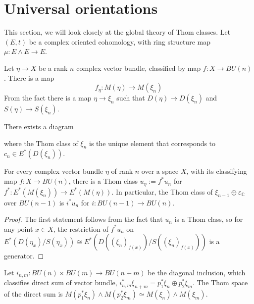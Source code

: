 \section{Universal orientations}\label{sec:chromatichomotopy-universalorientation}


This section, we will look closely at the global theory of Thom classes. Let $(E,t)$ be a complex oriented cohomology, with ring structure map $\mu:E\wedge E\to E$.

Let $\eta\to X$ be a rank $n$ complex vector bundle, classified by map $f: X\to BU(n)$. There is a map 
\[
f_\eta:M(\eta)\to M(\xi_n)
\] From the fact there is a map $\eta\to \xi_n$ such that $D(\eta)\to D(\xi_n)$ and $S(\eta)\to S(\xi_n)$. 

There exists a diagram
\begin{center}
\end{center}
where the Thom class of $\xi_n$ is the unique element that corresponds to $c_n \in E^*(D(\xi_n))$.

\begin{proposition}
    For every complex vector bundle $\eta$ of rank $n$ over a space $X$, with its classifying map $f: X\to BU(n)$, there is a Thom class $u_\eta:=f^*u_n$  for $f^*: E^*(M(\xi_n))\to E^*(M(\eta))$. In particular, the Thom class of $\xi_{n-1}\oplus \varepsilon_\mathbb{C}$ over $BU(n-1)$ is $i^*u_n$ for $i: BU(n-1)\to BU(n)$.\end{proposition}
\begin{proof}
    The first statement follows from the fact that $u_n$ is a Thom class, so for any point $x\in X$, the restriction of $f^*u_n$ on $E^*(D(\eta_x)/S(\eta_x))\cong E^*(D((\xi_n)_{f(x)})/S((\xi_n)_{f(x)}))$ is a generator.
\end{proof}

Let $i_{n,m}: BU(n)\times BU(m)\to BU(n+m)$ be the diagonal inclusion, which classifies direct sum of vector bundle, $i_{n,m}^*\xi_{n+m}=p_1^*\xi_n\oplus p_2^*\xi_m$. The Thom space of the direct sum is $M(p_1^*\xi_n)\wedge M(p_2^*\xi_m)\simeq M(\xi_n)\wedge M(\xi_m)$. 

